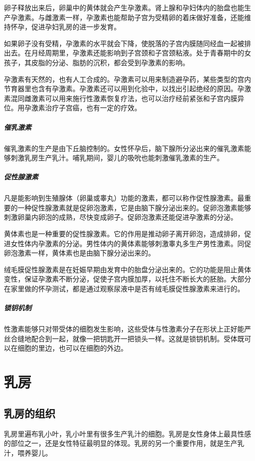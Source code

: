 \begin{enumerate}
卵子释放出来后，卵巢中的黄体就会产生孕激素。肾上腺和孕妇体内的胎盘也能生产孕激素。与雌激素一样，孕激素也能帮助子宫为受精卵的着床做好准备，还能维持怀孕，促进孕妇乳房的进一步发育。

如果卵子没有受精，孕激素的水平就会下降，使脱落的子宫内膜随同经血一起被排出去。在月经周期里，孕激素还能影响到子宫颈和子宫颈粘液。处于青春期中的女孩子，其皮脂的分泌、脂肪的沉积，都会受到孕激素的影响。

孕激素有天然的，也有人工合成的。孕激素可以用来制造避孕药，某些类型的宫内节育器里也含有孕激素。孕激素还可以用到化验中，以找出引起绝经的原因。孕激素混同雌激素可以用来施行性激素恢复疗法，也可以治疗经前紧张和子宫内膜异位。用孕激素治疗子宫癌，也有一定的疗效。

\subparagraph{催乳激素}

催乳激素的生产是由下丘脑控制的。女性怀孕后，脑下腺所分泌出来的催乳激素能够刺激乳房生产乳汁。哺乳期间，婴儿的吸吮也能刺激催乳激素的生产。

\subparagraph{促性腺激素}

凡是能影响到生殖腺体（卵巢或睾丸）功能的激素，都可以称作促性腺激素。最重要的一种促性腺激素就是促卵泡激素，它是由脑下腺分泌出来的。促卵泡激素能够刺激卵巢内卵泡的成熟，尽快变成卵子。促卵泡激素还能促进孕激素的分泌。

黄体素也是一种重要的促性腺激素。它的作用是推动卵子离开卵泡，造成排卵，促进女性体内孕激素的分泌。男性体内的黄体素能够刺激睾丸多生产男性激素。同促卵泡激素一样，黄体素也是由脑下腺分泌出来的。

绒毛膜促性腺激素是在妊娠早期由发育中的胎盘分泌出来的。它的功能是阻止黄体变性，保证孕激素不断分泌，促使子宫内膜加厚，以托住不断长大的胚胎。大部分在家里做的怀孕测试，都是通过观察尿液中是否有绒毛膜促性腺激素来进行的。

\subparagraph{锁钥机制}

性激素能够只对带受体的细胞发生影响，这些受体与性激素分子在形状上正好能严丝合缝地配合到一起，就像一把钥匙开一把锁头一样。这就是锁钥机制。受体既可以在细胞的里边，也可以在细胞的外边。

\section{乳房}

\subsection{乳房的组织}

乳房里遍布乳小叶，乳小叶里有很多生产乳汁的细胞。乳房是女性身体上最具性感的部位之一，还是女性特征最明显的体现。乳房的另一个重要作用，就是生产乳汁，喂养婴儿。


\end{enumerate}
